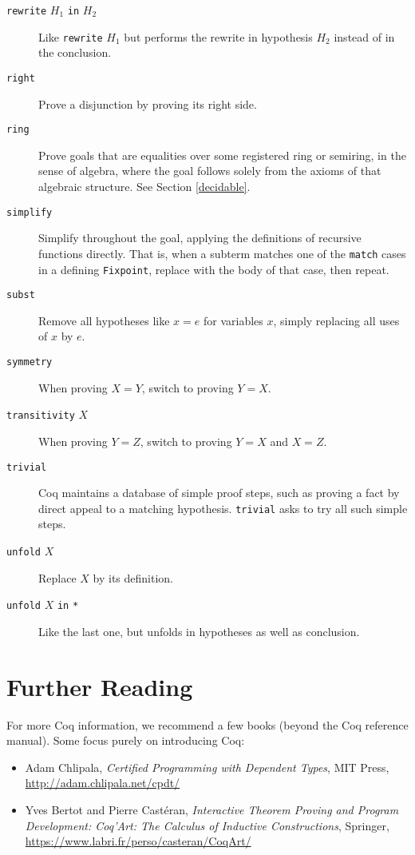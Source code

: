 \documentclass{amsbook}
\theoremstyle{definition}
\theoremstyle{remark}
\numberwithin{section}{chapter}
\numberwithin{equation}{chapter}
\begin{document}
\begin{description}
  \item[\texttt{rewrite} $H_1$ \texttt{in} $H_2$] Like \texttt{rewrite} $H_1$ but performs the rewrite in hypothesis $H_2$ instead of in the conclusion.
  \item[\texttt{right}] Prove a disjunction by proving its right side.
  \item[\texttt{ring}] Prove goals that are equalities over some registered ring or semiring, in the sense of algebra, where the goal follows solely from the axioms of that algebraic structure.  See Section \ref{decidable}.
  \item[\texttt{simplify}] Simplify throughout the goal, applying the definitions of recursive functions directly.  That is, when a subterm matches one of the \texttt{match} cases in a defining \texttt{Fixpoint}, replace with the body of that case, then repeat.
  \item[\texttt{subst}] Remove all hypotheses like $x = e$ for variables $x$, simply replacing all uses of $x$ by $e$.
  \item[\texttt{symmetry}] When proving $X = Y$, switch to proving $Y = X$.
  \item[\texttt{transitivity} $X$] When proving $Y = Z$, switch to proving $Y = X$ and $X = Z$.
  \item[\texttt{trivial}] Coq maintains a database of simple proof steps, such as proving a fact by direct appeal to a matching hypothesis.  \texttt{trivial} asks to try all such simple steps.
  \item[\texttt{unfold} $X$] Replace $X$ by its definition.
  \item[\texttt{unfold} $X$ \texttt{in} \texttt{*}] Like the last one, but unfolds in hypotheses as well as conclusion.
\end{description}

\section{Further Reading}

For more Coq information, we recommend a few books (beyond the Coq reference manual).  Some focus purely on introducing Coq:

\begin{itemize}
  \item Adam Chlipala, \emph{Certified Programming with Dependent Types}, MIT Press, \url{http://adam.chlipala.net/cpdt/}
  \item Yves Bertot and Pierre Cast\'eran, \emph{Interactive Theorem Proving and Program Development: Coq'Art: The Calculus of Inductive Constructions}, Springer, \url{https://www.labri.fr/perso/casteran/CoqArt/}
\end{itemize}
\end{document}
